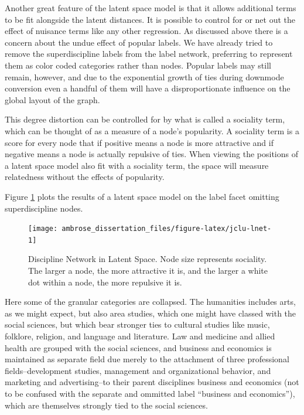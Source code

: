 \documentclass[]{book}
\theoremstyle{definition}
\theoremstyle{definition}
\theoremstyle{definition}
\theoremstyle{remark}
\begin{document}
Another great feature of the latent space model is that it allows
additional terms to be fit alongside the latent distances. It is
possible to control for or net out the effect of nuisance terms like any
other regression. As discussed above there is a concern about the undue
effect of popular labels. We have already tried to remove the
superdiscipline labels from the label network, preferring to represent
them as color coded categories rather than nodes. Popular labels may
still remain, however, and due to the exponential growth of ties during
downmode conversion even a handful of them will have a disproportionate
influence on the global layout of the graph.

This degree distortion can be controlled for by what is called a
sociality term, which can be thought of as a measure of a node's
popularity. A sociality term is a score for every node that if positive
means a node is more attractive and if negative means a node is actually
repulsive of ties. When viewing the positions of a latent space model
also fit with a sociality term, the space will measure relatedness
without the effects of popularity.

Figure \ref{fig:jclu-lnet} plots the results of a latent space model on
the label facet omitting superdiscipline nodes.

\begin{figure}

{\centering \texttt{[image: ambrose\_dissertation\_files/figure-latex/jclu-lnet-1]} 

}

\caption{Discipline Network in Latent Space. Node size represents sociality. The larger a node, the more attractive it is, and the larger a white dot within a node, the more repulsive it is.}\label{fig:jclu-lnet}
\end{figure}

Here some of the granular categories are collapsed. The humanities
includes arts, as we might expect, but also area studies, which one
might have classed with the social sciences, but which bear stronger
ties to cultural studies like music, folklore, religion, and language
and literature. Law and medicine and allied health are grouped with the
social sciences, and business and economics is maintained as separate
field due merely to the attachment of three professional
fields--development studies, management and organizational behavior, and
marketing and advertising--to their parent disciplines business and
economics (not to be confused with the separate and ommitted label
``business and economics''), which are themselves strongly tied to the
social sciences.
\end{document}
